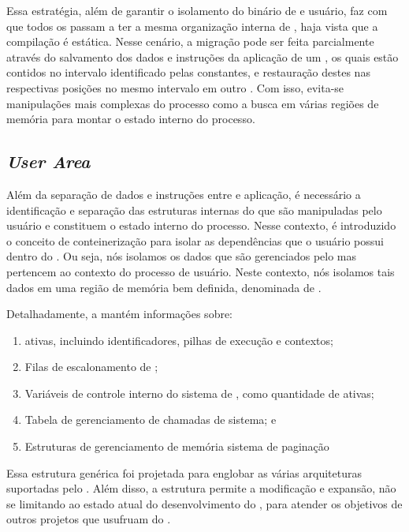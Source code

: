    Essa estratégia, além de garantir o isolamento do binário de  e usuário, faz com que todos os \clusters passam a ter a mesma organização interna de , haja vista que a compilação é estática. Nesse cenário, a migração pode ser feita parcialmente através do salvamento dos dados e instruções da aplicação de um \cluster, os quais estão contidos no intervalo identificado pelas constantes, e restauração destes nas respectivas posições \ie no mesmo intervalo em outro \cluster. Com isso, evita-se manipulações mais complexas do processo como a busca em várias regiões de memória para montar o estado interno do processo.

    
\subsection{\textit{User Area}}
\label{sec.uarea}

    Além da separação de dados e instruções entre  e aplicação, é necessário a identificação e separação das estruturas internas do \so que são manipuladas pelo usuário e constituem o estado interno do processo. Nesse contexto, é introduzido o conceito de conteinerização para isolar as dependências que o usuário possui dentro do \cluster. Ou seja, nós isolamos os dados que são gerenciados pelo  mas pertencem ao contexto do processo de usuário. Neste contexto, nós isolamos tais dados em uma região de memória bem definida, denominada de \uarea. 

    Detalhadamente, a \uarea mantém informações sobre:
    \begin{enumerate}[label=(\roman*)]
        \item \Threads ativas, incluindo identificadores, pilhas de execução e contextos;
        \item Filas de escalonamento de \threads;
        \item Variáveis de controle interno do sistema de \threads, como quantidade de \threads ativas;
        \item Tabela de gerenciamento de chamadas de sistema; e
        \item Estruturas de gerenciamento de memória \eg sistema de paginação
    \end{enumerate}

    Essa estrutura genérica foi projetada para englobar as várias arquiteturas suportadas pelo \nanvix. Além disso, a estrutura permite a modificação e expansão, não se limitando ao estado atual do desenvolvimento do \nanvix, para atender os objetivos de outros projetos que usufruam do \nanvix.

